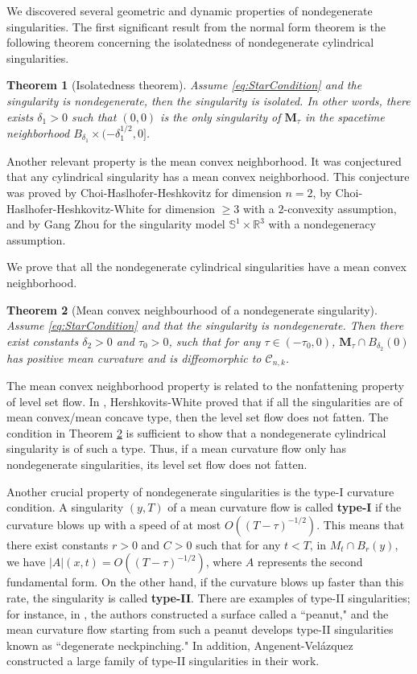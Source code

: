\documentclass[11pt]{amsart}
\numberwithin{equation}{section}
\newtheorem{theorem}{Theorem}[section]
\numberwithin{equation}{section}
\newcommand{\dt}{\delta}
\newcommand{\bM}{\mathbf{M}}
\newcommand{\cC}{\mathcal{C}}
\begin{document}
	We discovered several geometric and dynamic properties of nondegenerate singularities. The first significant result from the normal form theorem is the following theorem concerning the isolatedness of nondegenerate cylindrical singularities.
	
	\begin{theorem}[Isolatedness theorem]\label{ThmIsolate}
		Assume \eqref{eq:StarCondition} and the singularity is nondegenerate, then the singularity is isolated. In other words, there exists $\dt_1>0$ such that $(0,0)$ is the only singularity of $\bM_\tau$ in the spacetime neighborhood $B_{\dt_1}\times(-\delta_1^{1/2},0]$. 
	\end{theorem}
	
	
	Another relevant property is the mean convex neighborhood. It was conjectured that any cylindrical singularity has a mean convex neighborhood. This conjecture was proved by Choi-Haslhofer-Heshkovitz \cite{CHH} for dimension $n=2$, by Choi-Haslhofer-Heshkovitz-White \cite{CHHW} for dimension $\geq 3$ with a $2$-convexity assumption, and by Gang Zhou \cite{G1} for the singularity model $\mathbb{S}^1\times\mathbb{R}^3$ with a nondegeneracy assumption. 
	
	We prove that all the nondegenerate cylindrical singularities have a mean convex neighborhood.
	
	\begin{theorem}[Mean convex neighbourhood of a nondegenerate singularity]\label{prop:Mconnbhd}
		Assume \eqref{eq:StarCondition} and that the singularity is nondegenerate. Then there exist constants $\dt_2>0$ and $\tau_0>0$, such that for any $\tau\in(-\tau_0,0)$, $\bM_\tau\cap B_{\dt_2}(0)$ has positive mean curvature and is diffeomorphic to $\cC_{n,k}$. 
	\end{theorem}
	
	The mean convex neighborhood property is related to the nonfattening property of level set flow. In \cite{HershkovitsWhite20_Nonfattening}, Hershkovits-White proved that if all the singularities are of mean convex/mean concave type, then the level set flow does not fatten. The condition in Theorem \ref{prop:Mconnbhd} is sufficient to show that a nondegenerate cylindrical singularity is of such a type. Thus, if a mean curvature flow only has nondegenerate singularities, its level set flow does not fatten. 
	
	
	Another crucial property of nondegenerate singularities is the type-I curvature condition. A singularity $(y,T)$ of a mean curvature flow is called \textbf{type-I} if the curvature blows up with a speed of at most $O((T-\tau)^{-1/2})$. This means that there exist constants $r>0$ and $C>0$ such that for any $t<T$, in $M_t\cap B_r(y)$, we have $|A|(x,t)=O((T-\tau)^{-1/2})$, where $A$ represents the second fundamental form. On the other hand, if the curvature blows up faster than this rate, the singularity is called \textbf{type-II}. There are examples of type-II singularities; for instance, in \cite{AAG}, the authors constructed a surface called a ``peanut," and the mean curvature flow starting from such a peanut develops type-II singularities known as ``degenerate neckpinching." In addition, Angenent-Vel\'azquez \cite{AV} constructed a large family of type-II singularities in their work.
	
\end{document}

